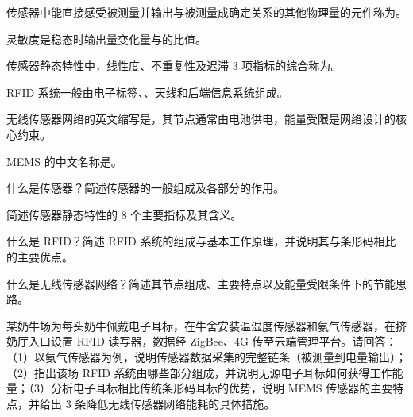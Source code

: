 \documentclass[a4paper,11pt]{article}
\begin{document}
\q 传感器中能直接感受被测量并输出与被测量成确定关系的其他物理量的元件称为\fillblanks[2.0cm]。

\q 灵敏度是稳态时输出量变化量与\fillblanks[2.6cm]的比值。

\q 传感器静态特性中，线性度、不重复性及迟滞 3 项指标的综合称为\fillblanks[1.8cm]。

\q RFID 系统一般由电子标签、\fillblanks[1.8cm]、天线和后端信息系统组成。

\q 无线传感器网络的英文缩写是\fillblanks[1.2cm]，其节点通常由电池供电，能量受限是网络设计的核心约束。

\q MEMS 的中文名称是\fillblanks[2.8cm]。

\newpage
{}
\q 什么是传感器？简述传感器的一般组成及各部分的作用。\anslines{2.4cm}

\q 简述传感器静态特性的 8 个主要指标及其含义。\anslines{2.4cm}

\q 什么是 RFID？简述 RFID 系统的组成与基本工作原理，并说明其与条形码相比的主要优点。\anslines{2.4cm}

\q 什么是无线传感器网络？简述其节点组成、主要特点以及能量受限条件下的节能思路。\anslines{2.4cm}

\newpage
{}
\q 某奶牛场为每头奶牛佩戴电子耳标，在牛舍安装温湿度传感器和氨气传感器，在挤奶厅入口设置 RFID 读写器，数据经 ZigBee、4G 传至云端管理平台。请回答：（1）以氨气传感器为例，说明传感器数据采集的完整链条（被测量到电量输出）；（2）指出该场 RFID 系统由哪些部分组成，并说明无源电子耳标如何获得工作能量；（3）分析电子耳标相比传统条形码耳标的优势，说明 MEMS 传感器的主要特点，并给出 3 条降低无线传感器网络能耗的具体措施。\anslines{5cm}
\end{document}
